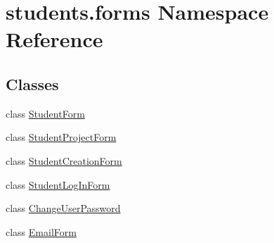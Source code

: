 \hypertarget{namespacestudents_1_1forms}{\section{students.\-forms Namespace Reference}
\label{namespacestudents_1_1forms}
}
\subsection*{Classes}
\begin{DoxyCompactItemize}
\item 
class \hyperlink{classstudents_1_1forms_1_1_student_form}{Student\-Form}
\item 
class \hyperlink{classstudents_1_1forms_1_1_student_project_form}{Student\-Project\-Form}
\item 
class \hyperlink{classstudents_1_1forms_1_1_student_creation_form}{Student\-Creation\-Form}
\item 
class \hyperlink{classstudents_1_1forms_1_1_student_log_in_form}{Student\-Log\-In\-Form}
\item 
class \hyperlink{classstudents_1_1forms_1_1_change_user_password}{Change\-User\-Password}
\item 
class \hyperlink{classstudents_1_1forms_1_1_email_form}{Email\-Form}
\end{DoxyCompactItemize}
